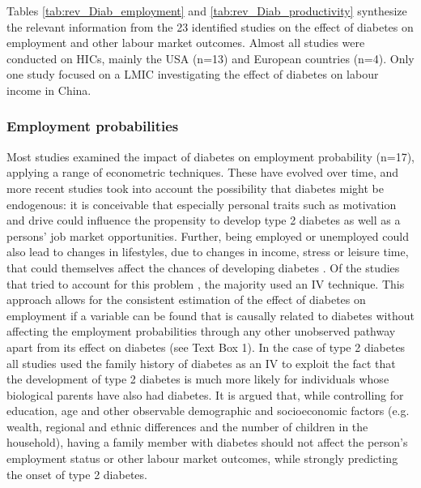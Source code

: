 Tables \ref{tab:rev_Diab_employment} and \ref{tab:rev_Diab_productivity} synthesize the relevant information from the 23 identified studies on the effect of diabetes on employment and other labour market outcomes. Almost all studies were conducted on \acp{HIC}, mainly the USA (n=13) and European countries (n=4). Only one study focused on a \ac{LMIC} investigating the effect of diabetes on labour income in China.

\subsubsection{Employment probabilities}
Most studies examined the impact of diabetes on employment probability (n=17), applying a range of econometric techniques. These have evolved over time, and more recent studies took into account the possibility that diabetes might be endogenous: it is conceivable that especially personal traits such as motivation and drive could influence the propensity to develop type 2 diabetes as well as a persons' job market opportunities. Further, being employed or unemployed could also lead to changes in lifestyles, due to changes in income, stress or leisure time, that could themselves affect the chances of developing diabetes \parencite{Brown2005}. Of the studies that tried to account for this problem \parencite{Brown2005,Minor2011,Latif2009,Lin2011b,Zhang2009,Harris2009}, the majority used an \ac{IV} technique. This approach allows for the consistent estimation of the effect of diabetes on employment if a variable can be found that is causally related to diabetes without affecting the employment probabilities through any other unobserved pathway apart from its effect on diabetes (see Text Box 1). In the case of type 2 diabetes all studies used the family history of diabetes as an \ac{IV} to exploit the fact that the development of type 2 diabetes is much more likely for individuals whose biological parents have also had diabetes. It is argued that, while controlling for education, age and other observable demographic and socioeconomic factors (e.g. wealth, regional and ethnic differences and the number of children in the household), having a family member with diabetes should not affect the person's employment status or other labour market outcomes, while strongly predicting the onset of type 2 diabetes. 

